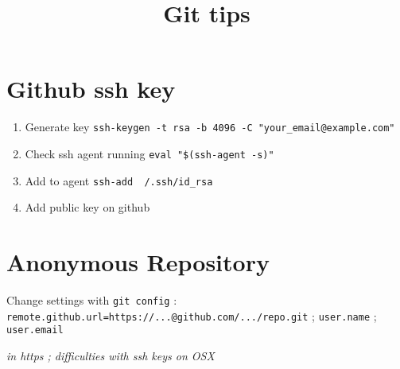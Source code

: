 


\title{Git tips}



\date{}


\maketitle

\justify

\renewcommand{\abstractname}{}

\begin{abstract}

\end{abstract}




\section*{Github ssh key}


\begin{enumerate}
\item Generate key \texttt{ssh-keygen -t rsa -b 4096 -C "your{\_}email@example.com"}
\item Check ssh agent running \texttt{eval "{\$}(ssh-agent -s)"}
\item Add to agent \texttt{ssh-add ~/.ssh/id{\_}rsa}
\item Add public key on github
\end{enumerate}




\section*{Anonymous Repository}

Change settings with \texttt{git config} : \texttt{remote.github.url=https://...@github.com/.../repo.git} ; \texttt{user.name} ; \texttt{user.email}

\textit{in https ; difficulties with ssh keys on OSX}
















